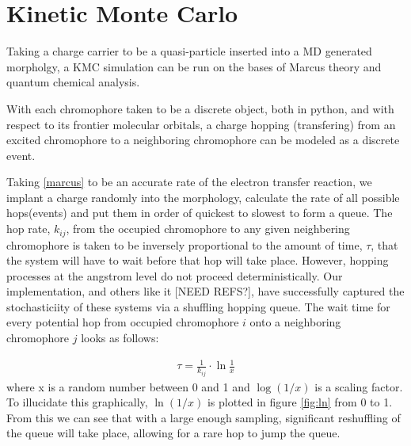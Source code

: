 \section{Kinetic Monte Carlo}

Taking a charge carrier to be a quasi-particle inserted into a MD generated morpholgy, a KMC
simulation can be run on the bases of Marcus theory and quantum chemical analysis.

With each chromophore taken to be a discrete object, both in python, and with respect to its frontier
molecular orbitals, a charge hopping (transfering) from an excited chromophore to a neighboring chromophore can be modeled
as a discrete event.

Taking \autoref{marcus} to be an
accurate rate of the electron transfer reaction, we implant a charge randomly into the morphology, calculate
the rate of all possible hops(events)
and put them in order of quickest to slowest to form a queue. The hop rate, $k_{ij}$, from the occupied chromophore to any
given neighbering chromophore is taken to be
inversely proportional to the amount of time, $\tau$, that the system will have to wait before that hop will
take place. However, hopping processes at the angstrom level do not proceed deterministically. 
Our implementation, and others like it [NEED REFS?], have
successfully captured the stochasticiity of these systems via a shuffling hopping queue.
The wait time for every potential hop from occupied chromophore $i$ onto a
neighboring chromophore $j$ looks as follows:

\begin{align}
    \tau = \frac{1}{k_{ij}} \cdot \ln{\frac{1}{x}} 
\end{align}
where x is a random number between 0 and 1 and $\log{(1/x)}$ is a scaling factor. To illucidate this
graphically, $\ln{(1/x)}$ is plotted in figure \ref{fig:ln} from 0 to 1. From this we can see that with
a large enough sampling, significant reshuffling of the queue will take place, allowing for a rare hop to jump
the queue.

